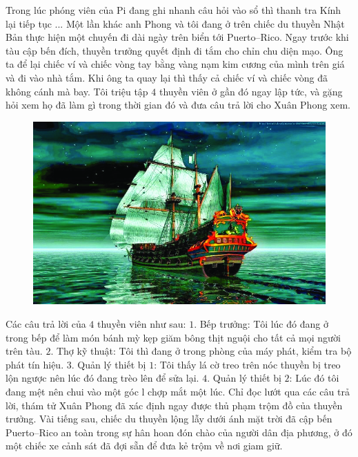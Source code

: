 	\vskip 0.1cm
	Trong lúc phóng viên của Pi đang ghi nhanh câu hỏi vào sổ thì thanh tra Kính lại tiếp tục ...
	\vskip 0.1cm
	{\color{red}{DU HÀNH TRÊN ĐẠI DƯƠNG}}
	\vskip 0.1cm
	Một lần khác anh Phong và tôi đang ở trên chiếc du thuyền Nhật Bản thực hiện một chuyến đi dài ngày trên biển tới Puerto--Rico. Ngay trước khi tàu cập bến đích, thuyền trưởng quyết định đi tắm cho chỉn chu diện mạo. Ông ta để lại chiếc ví và chiếc vòng tay bằng vàng nạm kim cương của mình trên giá và đi vào nhà tắm. Khi ông ta quay lại thì thấy cả chiếc ví và chiếc vòng đã không cánh mà bay. Tôi triệu tập $4$ thuyền viên ở gần đó ngay lập tức, và gặng hỏi xem họ đã làm gì trong thời gian đó và đưa câu trả lời cho Xuân Phong xem. 
		\begin{figure}[H]
			\centering
			\vspace*{-5pt}
			\captionsetup{labelformat= empty, justification=centering}
			\includegraphics[width=0.7\linewidth]{3}
			\vspace*{-10pt}
		\end{figure}
	Các câu trả lời của $4$ thuyền viên như sau: 
	\vskip 0.1cm
	$1.$ Bếp trưởng: Tôi lúc đó đang ở trong bếp để làm món bánh mỳ kẹp giăm bông thịt nguội cho tất cả mọi người trên tàu. 
	\vskip 0.1cm
	$2.$ Thợ kỹ thuật: Tôi thì đang ở trong phòng của máy phát, kiểm tra bộ phát tín hiệu. 
	\vskip 0.1cm
	$3.$ Quản lý thiết bị $1$: Tôi thấy lá cờ treo trên nóc thuyền bị treo lộn ngược nên lúc đó đang trèo lên để sửa lại. 
	\vskip 0.1cm
	$4.$ Quản lý thiết bị $2$: Lúc đó tôi đang mệt nên chui vào một góc l chợp mắt một lúc. 
	\vskip 0.1cm
	Chỉ đọc lướt qua các câu trả lời, thám tử Xuân Phong đã xác định ngay được thủ phạm trộm đồ của thuyền trưởng. Vài tiếng sau, chiếc du thuyền lộng lẫy dưới ánh mặt trời đã cập bến Puerto--Rico an toàn trong sự hân hoan đón chào của người dân địa phương, ở đó một chiếc xe cảnh sát đã đợi sẵn để đưa kẻ trộm về nơi giam giữ. 

